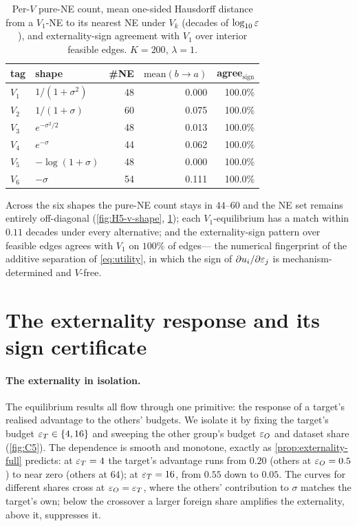\begin{table}[t]
  \centering
  \small
  \begin{tabular}{l l r r r}
    \toprule
    tag & shape & \#\ac{NE} & $\mathrm{mean}(b\!\to\!a)$ & agree$_{\mathrm{sign}}$ \\
    \midrule
    $V_1$ & $1/(1+\sigma^2)$   & 48 & 0.000 & 100.0\% \\
    $V_2$ & $1/(1+\sigma)$     & 60 & 0.075 & 100.0\% \\
    $V_3$ & $e^{-\sigma^2/2}$  & 48 & 0.013 & 100.0\% \\
    $V_4$ & $e^{-\sigma}$      & 44 & 0.062 & 100.0\% \\
    $V_5$ & $-\log(1+\sigma)$  & 48 & 0.000 & 100.0\% \\
    $V_6$ & $-\sigma$          & 54 & 0.111 & 100.0\% \\
    \bottomrule
  \end{tabular}
  \caption{Per-$V$ pure-\ac{NE} count, mean one-sided Hausdorff distance
    from a $V_1$-\ac{NE} to its nearest \ac{NE} under $V_k$ (decades of
    $\log_{10}\varepsilon$), and externality-sign agreement with $V_1$ over
    interior feasible edges. $K = 200$, $\lambda = 1$.}
  \label{tab:H5-v-shape}
\end{table}

Across the six shapes the pure-\ac{NE} count stays in $44$--$60$ and the
\ac{NE} set remains entirely off-diagonal (\cref{fig:H5-v-shape},
\cref{tab:H5-v-shape}); each $V_1$-equilibrium has a match within
$0.11$ decades under every alternative; and the externality-sign
pattern over feasible edges agrees with $V_1$ on $100\%$ of edges---
the numerical fingerprint of the additive separation of
\eqref{eq:utility}, in which the sign of $\partial u_i / \partial
\varepsilon_j$ is mechanism-determined and $V$-free.

\section{The externality response and its sign certificate}
\label{app:certificate}

\paragraph{The externality in isolation.} The equilibrium results all
flow through one primitive: the response of a target's realised
advantage to the others' budgets. We isolate it by fixing the
target's budget $\varepsilon_T \in \{4, 16\}$ and sweeping the other group's
budget $\varepsilon_O$ and dataset share (\cref{fig:C5}). The dependence is
smooth and monotone, exactly as \cref{prop:externality-full} predicts:
at $\varepsilon_T = 4$ the target's advantage runs from $0.20$ (others at
$\varepsilon_O = 0.5$) to near zero (others at $64$); at $\varepsilon_T = 16$, from
$0.55$ down to $0.05$. The curves for different shares cross at
$\varepsilon_O = \varepsilon_T$, where the others' contribution to $\sigma$ matches
the target's own; below the crossover a larger foreign share
amplifies the externality, above it, suppresses it.

